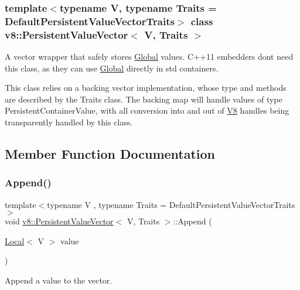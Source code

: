 \subsubsection*{template$<$typename V, typename Traits = Default\+Persistent\+Value\+Vector\+Traits$>$\newline
class v8\+::\+Persistent\+Value\+Vector$<$ V, Traits $>$}

A vector wrapper that safely stores \mbox{\hyperlink{classv8_1_1Global}{Global}} values. C++11 embedders don\textquotesingle{}t need this class, as they can use \mbox{\hyperlink{classv8_1_1Global}{Global}} directly in std containers.

This class relies on a backing vector implementation, whose type and methods are described by the Traits class. The backing map will handle values of type Persistent\+Container\+Value, with all conversion into and out of \mbox{\hyperlink{classv8_1_1V8}{V8}} handles being transparently handled by this class. 

\subsection{Member Function Documentation}
\mbox{\label{classv8_1_1PersistentValueVector_a02376c6d16be29084db46f65473477fb}} 
\subsubsection{\texorpdfstring{Append()}{Append()}\hspace{0.1cm}{\footnotesize\ttfamily [1/2]}}
{\footnotesize\ttfamily template$<$typename V , typename Traits  = Default\+Persistent\+Value\+Vector\+Traits$>$ \\
void \mbox{\hyperlink{classv8_1_1PersistentValueVector}{v8\+::\+Persistent\+Value\+Vector}}$<$ V, Traits $>$\+::Append (\begin{DoxyParamCaption}\item[{\mbox{\hyperlink{classv8_1_1Local}{Local}}$<$ V $>$}]{value }\end{DoxyParamCaption})\hspace{0.3cm}{\ttfamily [inline]}}

Append a value to the vector. \mbox{\label{classv8_1_1PersistentValueVector_ad076923fd0046196670e87e996582546}} 
